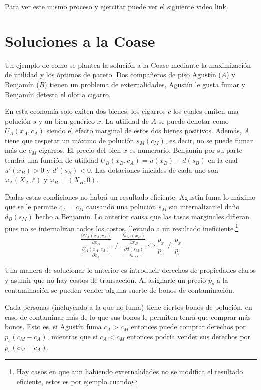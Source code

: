Para ver este mismo proceso y ejercitar puede ver el siguiente video \href{https://youtu.be/NgxHDSLMPbo?si=6epG7OJTwx6sANFj}{\underline{link}}.


\section{Soluciones a la Coase}
Un ejemplo de como se plantea la solución a la Coase mediante la maximización de utilidad y los óptimos de pareto. Dos compañeros de piso Agustín ($A$) y Benjamín ($B$) tienen un problema de externalidades, Agustín le gusta fumar y Benjamín detesta el olor a cigarro. 

En esta economía solo exiten dos bienes, los cigarros $c$ los cuales emiten una polución $s$ y un bien genérico $x$. La utilidad de $A$ se puede denotar como $U_A (x_A,c_A)$ siendo el efecto marginal de estos dos bienes positivos. Además, $A$ tiene que respetar un máximo de polución $s_M (c_M)$, es decir, no se puede fumar más de $c_M$ cigarros. El precio del bien $x$ es numerario. Benjamín por su parte tendrá una función de utilidad $U_B(x_B, c_A) = u(x_B) + d(s_B)$ en la cual $u'(x_B) >0$ y $d'(s_B)<0$. Las dotaciones iniciales de cada uno son $\omega_A (X_A,\bar{c})$ y $\omega_B = (X_B,0)$. 

Dadas estas condiciones no habrá un resultado eficiente. Agustín fuma lo máximo que se le permite $c_A = c_M$ causando una polución $s_M$ sin internalizar el daño $d_B(s_M)$ hecho a Benjamín. Lo anterior causa que las tasas marginales difieran pues no se internalizan todos los costos, llevando a un resultado ineficiente.\footnote{Hay casos en que aun habiendo externalidades no se modifica el resultado eficiente, estos es por ejemplo cuando} 
\begin{equation}
    \frac{\frac{\partial U_A(x_A,c_A)}{\partial x_A}}{\frac{U_A(x_A,c_A)}{\partial c_A}} \neq \frac{\frac{\partial u_B(x_B)}{\partial x_B}}{\frac{\partial d(s_M)}{\partial s_M}}
    \Longleftrightarrow
    \frac{p_x}{p_c} \neq \frac{p_x}{ p_s}
\end{equation}

Una manera de solucionar lo anterior es introducir derechos de propiedades claros y asumir que no hay costos de transacción. Al asignarle un precio $p_s$ a la contaminación se pueden vender alguna suerte de bonos de contaminación. 

Cada personas (incluyendo a la que no fuma) tiene ciertos bonos de polución, en caso de contaminar más de lo que sus bonos le permiten tenrá que comprar más bonos. Esto es, si Agustín fuma $c_A>c_M$ entonces puede comprar derechos por $p_s(c_M-c_A)$, mientras que si $c_A<c_M$ entonces podría vender sus derechos por $p_s(c_M-c_A)$. 

